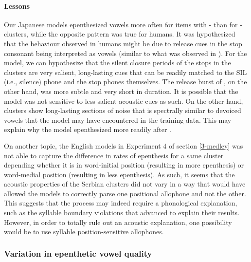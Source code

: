 {\paragraph{Lessons}
Our Japanese models epenthesized vowels more often for items with - than for -clusters, while the opposite pattern was true for humans. It was hypothesized that the behaviour observed in humans might be due to release cues in the stop consonant  being interpreted as vowels (similar to what was observed in \cite{dejong2012}). For the model, we can hypothesize that the silent closure periods of the stops in the  clusters are very salient, long-lasting cues that can be readily matched to the SIL (i.e., silence) phone and the stop phones themselves. The release burst of , on the other hand, was more subtle and very short in duration. It is possible that the model was not sensitive to less salient acoustic cues as such. On the other hand,  clusters show long-lasting sections of noise that is spectrally similar to devoiced vowels that the model may have encountered in the training data. This may explain why the model epenthesized more readily after .

On another topic, the English models in Experiment 4 of section \ref{3-medley} was not able to capture the difference in rates of epenthesis for a same cluster depending whether it is in word-initial position (resulting in more epenthesis) or word-medial position (resulting in less epenthesis). As such, it seems that the acoustic properties of the Serbian clusters did not vary in a way that would have allowed the models to correctly parse one positional allophone and not the other. This suggests that the process may indeed require a phonological explanation, such as the syllable boundary violations that \cite{kabak2007} advanced to explain their results. However, in order to totally rule out an acoustic explanation, one possibility would be to use syllable position-sensitive allophones.  

\subsubsection{Variation in epenthetic vowel quality}
}
